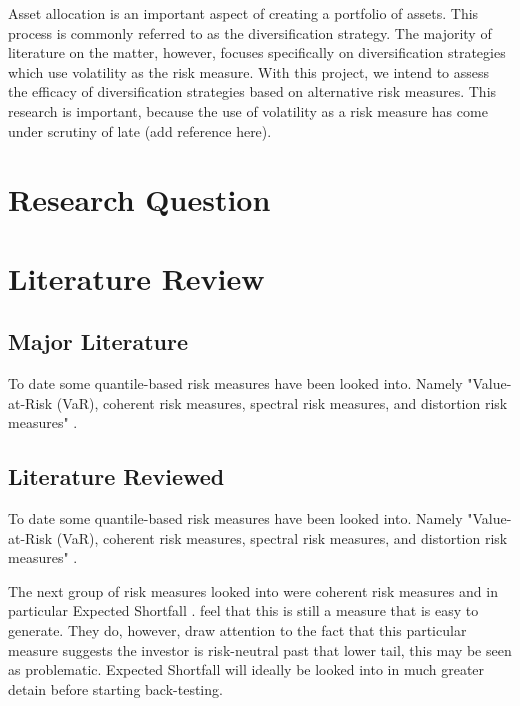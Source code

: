 \documentclass[12pt,a4paper]{article}
\begin{document}
Asset allocation is an important aspect of creating a portfolio of assets. This process is commonly referred to as the diversification strategy. The majority of literature on the matter, however, focuses specifically on diversification strategies which use volatility as the risk measure. With this project, we intend to assess the efficacy of diversification strategies based on alternative risk measures.
This research is important, because the use of volatility as a risk measure has come under scrutiny of late (add reference here).




\section{Research Question}
\label{sec:ResQues}


\section{Literature Review}
\label{sec:LitRev}

\subsection{Major Literature}
\label{subsec:MajLit}
To date some quantile-based risk measures have been looked into. Namely "Value-at-Risk (VaR), coherent risk measures, spectral risk measures, and distortion risk measures" \citep{dowd2006after}.

\subsection{Literature Reviewed}
\label{subsec:LitRevd}	

To date some quantile-based risk measures have been looked into. Namely "Value-at-Risk (VaR), coherent risk measures, spectral risk measures, and distortion risk measures" \citep{dowd2006after}.

The next group of risk measures looked into were coherent risk measures and in particular Expected Shortfall \citep{ACERBI20021505}. \cite{dowd2006after} feel that this is still a measure that is easy to generate. They do, however, draw attention to the fact that this particular measure suggests the investor is risk-neutral past that lower tail, this may be seen as problematic. Expected Shortfall will ideally be looked into in much greater detain before starting back-testing.
\end{document}
